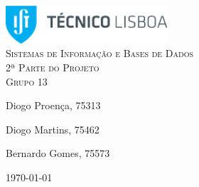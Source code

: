 \begin{titlepage}

	\begin{center}

		\includegraphics[width=6cm]{./title}\\[3cm]

		\textsc{\LARGE Sistemas de Informação e Bases de Dados}\\[1.5cm]

		\textsc{\Large 2ª Parte do Projeto}\\[1.5cm]
		
		\textsc{\Large Grupo 13}\\[1.5cm]


		


		\noindent
		\begin{minipage}{0.4\textwidth}
			\begin{flushleft} \large
				Diogo Proença, 75313
			\end{flushleft}
		\end{minipage}
		\begin{minipage}{0.4\textwidth}
			\begin{flushright} \large
				Diogo Martins, 75462
			\end{flushright}
		\end{minipage}
		
		\begin{minipage}{0.4\textwidth}
			\begin{flushright} \large
				Bernardo Gomes, 75573	
			\end{flushright}
		\end{minipage}

		\vfill

		{\large \today}


	\end{center}

\end{titlepage}